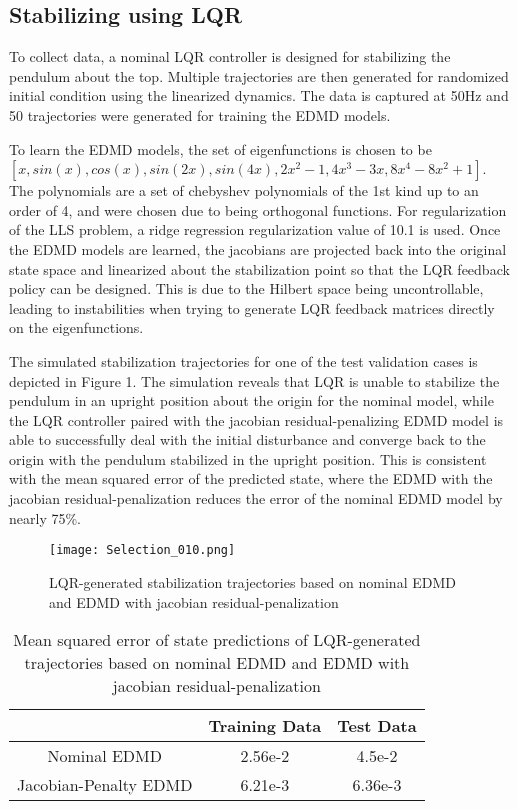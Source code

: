 \documentclass[letterpaper, 10 pt, conference]{ieeeconf}  %
\begin{document}
\subsection{Stabilizing using LQR}

To collect data, a nominal LQR controller is designed for stabilizing the pendulum about the top. Multiple trajectories are then generated for randomized initial condition using the linearized dynamics. The data is captured at 50Hz and 50 trajectories were generated for training the EDMD models.

To learn the EDMD models, the set of eigenfunctions is chosen to be $[x, sin(x), cos(x), sin(2x), sin(4x), 2x^{2} - 1, 4x^{3} - 3x, 8x^{4} - 8x^{2} + 1]$. The polynomials are a set of chebyshev polynomials of the 1st kind up to an order of 4, and were chosen due to being orthogonal functions. For regularization of the LLS problem, a ridge regression regularization value of 10.1 is used. Once the EDMD models are learned, the jacobians are projected back into the original state space and linearized about the stabilization point so that the LQR feedback policy can be designed. This is due to the Hilbert space being uncontrollable, leading to instabilities when trying to generate LQR feedback matrices directly on the eigenfunctions.

The simulated stabilization trajectories for one of the test validation cases is depicted in Figure 1. The simulation reveals that LQR is unable to stabilize the pendulum in an upright position about the origin for the nominal model, while the LQR controller paired with the jacobian residual-penalizing EDMD model is able to successfully deal with the initial disturbance and converge back to the origin with the pendulum stabilized in the upright position. This is consistent with the mean squared error of the predicted state, where the EDMD with the jacobian residual-penalization reduces the error of the nominal EDMD model by nearly 75\%.

\begin{figure}[thpb]
  \centering
  \texttt{[image: Selection\_010.png]}
  \caption{LQR-generated stabilization trajectories based on nominal EDMD and EDMD with jacobian residual-penalization}
  \label{figurelabel}
\end{figure}

\begin{table}[h]
\begin{center}
\begin{tabular}{|c|c c|}
\hline
 & Training Data & Test Data\\
\hline
Nominal EDMD & 2.56e-2 & 4.5e-2\\
Jacobian-Penalty EDMD & 6.21e-3 & 6.36e-3\\
\hline
\end{tabular}
\end{center}
\caption{Mean squared error of state predictions of LQR-generated trajectories based on nominal EDMD and EDMD with jacobian residual-penalization}
\end{table}
\end{document}

